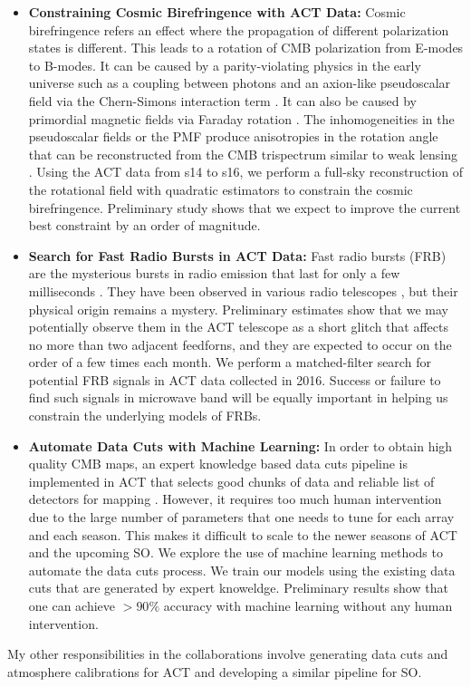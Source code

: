 \documentclass[12pt, notitlepage, onecolumn, amsmath, amssymb, aps]{revtex4-1}
\begin{document}
\begin{itemize}
\item \textbf{Constraining Cosmic Birefringence with ACT Data:} Cosmic
  birefringence refers an effect where the propagation of different
  polarization states is different. This leads to a rotation of CMB
  polarization from E-modes to B-modes. It can be caused by a
  parity-violating physics in the early universe such as a coupling
  between photons and an axion-like pseudoscalar field via the
  Chern-Simons interaction term \cite{Harari:1992ea,
    Carroll:1998zi}. It can also be caused by primordial magnetic
  fields via Faraday rotation \cite{Kosowsky:1996yc}. The
  inhomogeneities in the pseudoscalar fields or the PMF produce
  anisotropies in the rotation angle that can be reconstructed from
  the CMB trispectrum similar to weak lensing
  \cite{2009PhRvD..79l3009Y}. Using the ACT data from s14 to s16, we
  perform a full-sky reconstruction of the rotational field with
  quadratic estimators to constrain the cosmic birefringence.
  Preliminary study shows that we expect to improve the current best
  constraint by an order of magnitude.
\item \textbf{Search for Fast Radio Bursts in ACT Data:} Fast radio
  bursts (FRB) are the mysterious bursts in radio emission that last
  for only a few milliseconds \cite{lorimer07}. They have been
  observed in various radio telescopes \cite{petroff16}, but their
  physical origin remains a mystery. Preliminary estimates show that
  we may potentially observe them in the ACT telescope as a short
  glitch that affects no more than two adjacent feedforns, and they
  are expected to occur on the order of a few times each month. We
  perform a matched-filter search for potential FRB signals in ACT
  data collected in 2016. Success or failure to find such signals in
  microwave band will be equally important in helping us constrain
  the underlying models of FRBs.
\item \textbf{Automate Data Cuts with Machine Learning:} In order to
  obtain high quality CMB maps, an expert knowledge based data cuts
  pipeline is implemented in ACT that selects good chunks of data and
  reliable list of detectors for mapping \cite{duenner12}. However, it
  requires too much human intervention due to the large number of
  parameters that one needs to tune for each array and each season.
  This makes it difficult to scale to the newer seasons of ACT and the
  upcoming SO. We explore the use of machine learning methods to
  automate the data cuts process. We train our models using the
  existing data cuts that are generated by expert
  knoweldge. Preliminary results show that one can achieve $>90\%$
  accuracy with machine learning without any human intervention.
\end{itemize}
My other responsibilities in the collaborations involve generating
data cuts and atmosphere calibrations for ACT and developing a similar
pipeline for SO.
\end{document}
